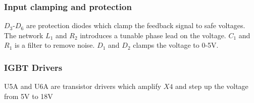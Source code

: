 \subsubsection{Input clamping and protection}
$D_3$-$D_6$ are protection diodes which clamp the feedback signal to safe voltages. The network $L_1$ and $R_2$ introduces a tunable phase lead on the voltage. $C_1$ and $R_1$ is a filter to remove noise. $D_1$ and $D_2$ clamps the voltage to 0-5V.

\subsubsection{IGBT Drivers}
U5A and U6A are transistor drivers which amplify $X4$ and step up the voltage from 5V to 18V





